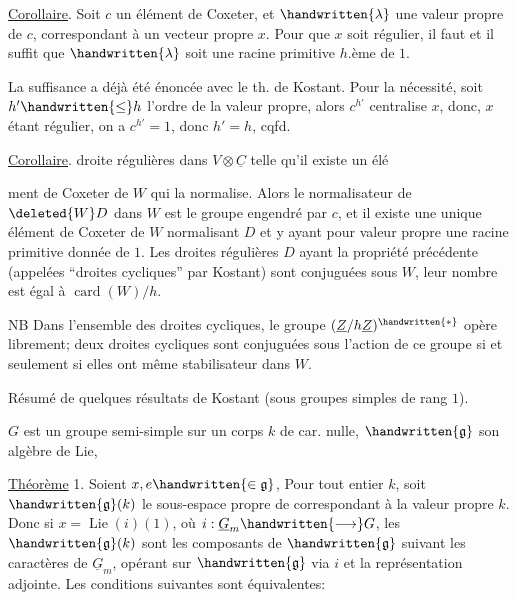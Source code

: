 \uline{Corollaire}. Soit $c$ un élément de Coxeter, et $\handwritten{\lambda}$ une valeur propre de $c$, correspondant à un vecteur propre $x$. Pour que $x$ soit régulier, il faut et il suffit que $\handwritten{\lambda}$ soit une racine primitive $h$.ème de $1$.

La suffisance a déjà été énoncée avec le th. de Kostant. Pour la nécessité, soit $h'\handwritten{\leq}h$ l'ordre de la valeur propre, alors $c^{h'}$ centralise $x$, donc, $x$ étant régulier, on a $c^{h'}=1$, donc $h'=h$, cqfd.

\uline{Corollaire}.   droite régulières dans $V\otimes\underline{C}$ telle qu'il existe un élé%

ment de Coxeter de $W$ qui la normalise. Alors le normalisateur de $\deleted{W}D$ dans $W$ est le groupe engendré par $c$, et il existe une unique élément de Coxeter de $W$ normalisant $D$ et y ayant pour valeur propre une racine primitive  donnée de $1$. Les droites régulières $D$ ayant la propriété précédente (appelées ``droites cycliques'' par Kostant) sont conjuguées sous $W$, leur nombre est égal à $\operatorname{card}(W)/h$.

NB Dans l'ensemble des droites cycliques, le groupe $(\underline{Z}/h\underline{Z})^{\handwritten{*}}$ opère librement; deux droites cycliques sont conjuguées sous l'action de ce groupe si et seulement si elles ont même stabilisateur dans $W$.

Résumé de quelques résultats de Kostant (sous groupes simples de rang $1$).

$G$ est un groupe semi-simple sur un corps $k$ de car. nulle, $\handwritten{\mathfrak{g}}$ son algèbre de Lie,

\uline{Théorème} 1.  Soient $x,e\handwritten{\in\mathfrak{g}}$, Pour tout entier $k$, soit $\handwritten{\mathfrak{g}}(k)$ le sous-espace propre de\hspace{1.5em} correspondant à la valeur propre $k$. Donc si $x=\operatorname{Lie}(i)(1)$, où $i:\underline{G}_m\handwritten{\longrightarrow}G$, les $\handwritten{\mathfrak{g}}(k)$ sont les  composants de $\handwritten{\mathfrak{g}}$ suivant les caractères de $\underline{G}_m$, opérant sur $\handwritten{\mathfrak{g}}$ via $i$ et la représentation adjointe. Les conditions suivantes sont équivalentes:

